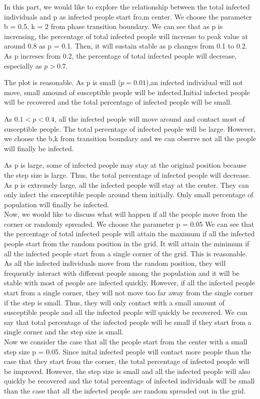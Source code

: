 \documentclass{article}
\begin{document}
In this part, we would like to explore the relationship between the total infected individuals and p as infected people start fro,m center. We choose the parameter b = 0.5, k = 2 from phase transition boundary.
We can see that as p is increasing, the percentage of total infected people will increase to peak value at around 0.8 as p = 0.1. Then, it will sustain stable as p changes from 0.1 to 0.2. As p increses from 0.2, the percentage of total infected people will decrease, especially as $p > 0.7$.


The plot is reasonable. As p is small ($p=0.01$),an infected individual will not move, small amound of susceptible people will be infected.Initial infected people will be recovered and the total percentage of infected people will be small.


As $ 0.1<p<0.4 $, all the infected people will move around and contact most of susceptible people. The total percentage of infected people will be large. However, we choose the b,k from transition boundary and we can observe not all the people will finally be infected.


As p is large, some of infected people may stay at the original position because the step size is large. Thus, the total percentage of infected people will decrease. As p is extremely large, all the infected people will stay at the center. They can only infect the susceptible people around them initially. Only small percentage of population will finally be infected.\\


Now, we would like to discuss what will happen if all the people move from the corner or randomly spreaded. We choose the parameter p = 0.05
We can see that the percentage of total infected people will attain the maximum if all the infected people start from the random position in the grid. It will attain the minimum if all the infected people start from a single corner of the grid. This is reasonable. As all the infected individuals move from the random position, they will frequently interact with different people among the population and it will be stable with most of people are infected quickly.
However, if all the infected people start from a single corner, they will not move too far away from the single corner if the step is small. Thus, they will only contact with a small amount of susceptible people and all the infected people will quickly be recovered. We can say that total percentage of the infected people will be small if they start from a single corner and the step size is small.\\
Now we consider the case that all the people start from the center with a small step size p = 0.05. Since inital infected people will contact more people than the case that they start from the corner, the total percentage of infected people will be improved. However, the step size is small and all the infected people will also  quickly be recovered and the total percentage of infected individuals will be small than the case that all the infected people are random spreaded out in the grid.
\end{document}
